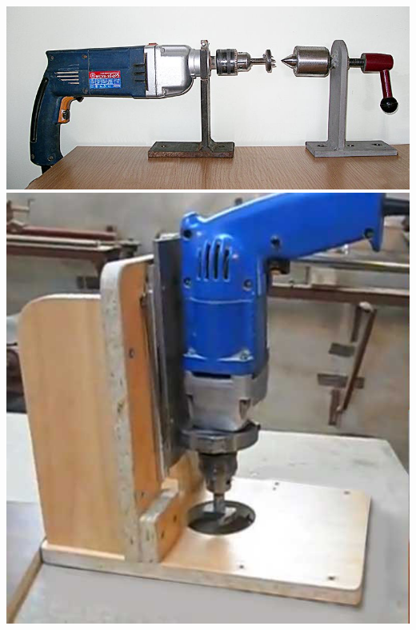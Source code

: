 \noindent\includegraphics[height=0.465\textheight]{tech/tools/DrelLathe2.jpg}
\noindent\includegraphics[height=0.465\textheight]{tech/tools/DrelBoren.jpg}
\clearpage



